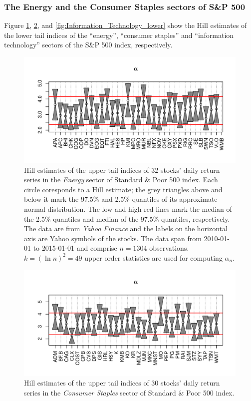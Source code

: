 \documentclass{article}
\newcommand{\1}[1]{
  \mathbf{1}_{\{#1\}}
}
\begin{document}
\subsubsection{The Energy and the Consumer Staples sectors of S\&P 500}
Figure \ref{fig:Energy_Hill_upper},
\ref{fig:Consumer_Staples_Hill_upper},
and \ref{fig:Information_Technology_lower}
show the Hill estimates of the
lower tail indices of the ``energy'', ``consumer staples'' and ``information
technology'' sectors of the S\&P 500 index, respectively.
\begin{figure}[htb!]
  \centering
  \includegraphics[width=\textwidth]{Energy_Hill_upper.pdf}
  \caption{Hill estimates of the upper tail indices of 32 stocks'
    daily return series in the {\it Energy} sector of Standard \& Poor
    500 index. Each circle coresponds to a Hill estimate; the grey
    triangles above and below it mark the 97.5\% and 2.5\% quantiles
    of its approximate normal distribution.
    The low and high red lines mark the median of the 2.5\% quantiles
    and median of the 97.5\% quantiles, respectively.
    The data are from {\it Yahoo Finance} and the labels on
    the horizontal axis are Yahoo symbols of the stocks. The data span
    from 2010-01-01 to 2015-01-01 and comprise $n=1304$
    observations. $k=(\ln n)^2 = 49$ upper order statistics are used
    for computing $\alpha_n$. 
  }
  \label{fig:Energy_Hill_upper}
\end{figure}

\begin{figure}[htb!]
  \centering
  \includegraphics[width=\textwidth]{Consumer_Staples_Hill_upper.pdf}
  \caption{Hill estimates of the upper tail indices of 30 stocks'
    daily return series in the {\it Consumer Staples} sector of
    Standard \& Poor 500 index.
  }
  \label{fig:Consumer_Staples_Hill_upper}
\end{figure}
\end{document}
